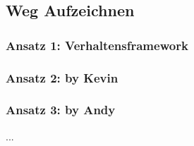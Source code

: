 \subsection{Weg Aufzeichnen}
\label{weg-aufzeichnen}

\subsubsection{Ansatz 1: Verhaltensframework}

\subsubsection{Ansatz 2: by Kevin}

\subsubsection{Ansatz 3: by Andy}
...
